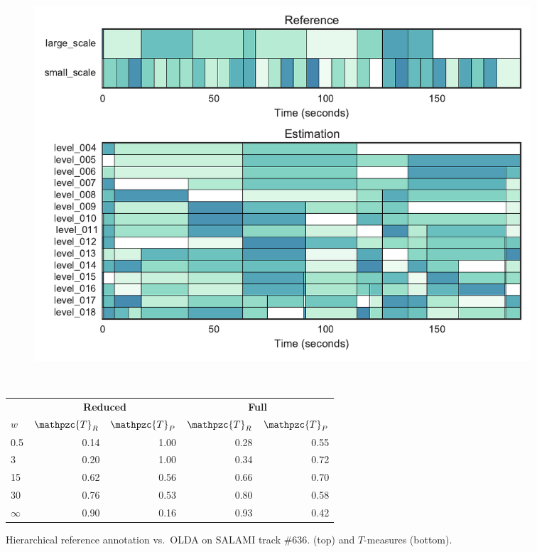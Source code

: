 \documentclass{article}
\def\shag{\ensuremath{\mathpzc{T}}}
\begin{document}
\begin{figure}[t]
  \centering
  \begin{subfigure}{\columnwidth}
    \centering
   \includegraphics[width=\columnwidth]{figs/SALAMI-OLDA}
  \end{subfigure}%
  \\
  \vspace{-\baselineskip}
  \begin{minipage}{\columnwidth}
    \small
    \centering
    \vspace{10pt}
    \begin{tabular}{lrrrr}
      & \multicolumn{2}{c}{\textbf{Reduced}} & \multicolumn{2}{c}{\textbf{Full}} \\
      $w$       & $\shag_R$    & $\shag_P$  & $\shag_R$ & $\shag_P$    \\
      \midrule
      0.5       & 0.14       & 1.00  & 0.28 & 0.55 \\
      3         & 0.20       & 1.00  & 0.34 & 0.72    \\
      15        & 0.62       & 0.56  & 0.66 & 0.70 \\
      30        & 0.76       & 0.53  & 0.80 & 0.58  \\
      $\infty$  & 0.90       & 0.16  & 0.93 & 0.42
  \end{tabular}
  \end{minipage}
  \caption{Hierarchical reference annotation vs.\ OLDA on SALAMI track \#636.
  (top) and $T$-measures (bottom).}\label{fig:SALAMI-OLDA}
\end{figure}
\end{document}
